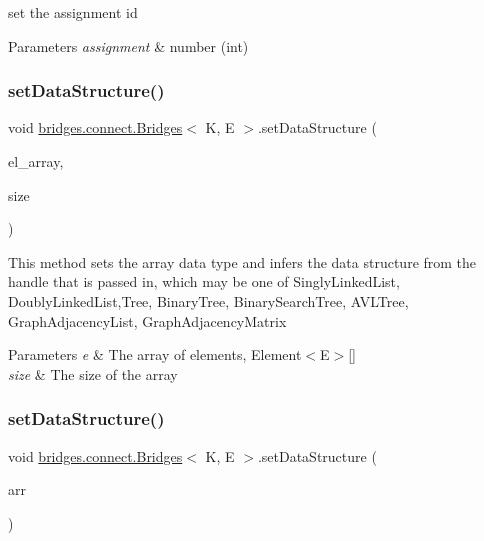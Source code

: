set the assignment id


\begin{DoxyParams}{Parameters}
{\em assignment} & number (int) \\
\hline
\end{DoxyParams}
\hypertarget{classbridges_1_1connect_1_1_bridges_a0cc12a419997a8ef0ef54afe9e65d1e9}{}\label{classbridges_1_1connect_1_1_bridges_a0cc12a419997a8ef0ef54afe9e65d1e9} 
\subsubsection{\texorpdfstring{set\+Data\+Structure()}{setDataStructure()}\hspace{0.1cm}{\footnotesize\ttfamily [1/12]}}
{\footnotesize\ttfamily void \hyperlink{classbridges_1_1connect_1_1_bridges}{bridges.\+connect.\+Bridges}$<$ K, E $>$.set\+Data\+Structure (\begin{DoxyParamCaption}\item[{\hyperlink{classbridges_1_1base_1_1_element}{Element}$<$ E $>$ \mbox{[}$\,$\mbox{]}}]{el\+\_\+array,  }\item[{int}]{size }\end{DoxyParamCaption})}

This method sets the array data type and infers the data structure from the handle that is passed in, which may be one of Singly\+Linked\+List, Doubly\+Linked\+List,Tree, Binary\+Tree, Binary\+Search\+Tree, A\+V\+L\+Tree, Graph\+Adjacency\+List, Graph\+Adjacency\+Matrix


\begin{DoxyParams}{Parameters}
{\em e} & The array of elements, Element$<$\+E$>$\mbox{[}\mbox{]} \\
\hline
{\em size} & The size of the array \\
\hline
\end{DoxyParams}
\hypertarget{classbridges_1_1connect_1_1_bridges_a2cd9af150b77b8337327ea67544a0e8f}{}\label{classbridges_1_1connect_1_1_bridges_a2cd9af150b77b8337327ea67544a0e8f} 
\subsubsection{\texorpdfstring{set\+Data\+Structure()}{setDataStructure()}\hspace{0.1cm}{\footnotesize\ttfamily [2/12]}}
{\footnotesize\ttfamily void \hyperlink{classbridges_1_1connect_1_1_bridges}{bridges.\+connect.\+Bridges}$<$ K, E $>$.set\+Data\+Structure (\begin{DoxyParamCaption}\item[{\hyperlink{classbridges_1_1base_1_1_array}{Array}$<$ E $>$}]{arr }\end{DoxyParamCaption})}

